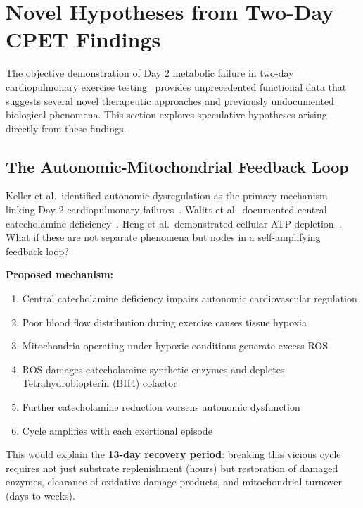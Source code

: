 \section{Novel Hypotheses from Two-Day CPET Findings}
\label{sec:cpet-hypotheses}

The objective demonstration of Day 2 metabolic failure in two-day cardiopulmonary exercise testing~\cite{keller2024cpet} provides unprecedented functional data that suggests several novel therapeutic approaches and previously undocumented biological phenomena. This section explores speculative hypotheses arising directly from these findings.

\subsection{The Autonomic-Mitochondrial Feedback Loop}
\label{subsec:autonomic-mito-loop}

\begin{open_question}
Keller et al.\ identified autonomic dysregulation as the primary mechanism linking Day 2 cardiopulmonary failures~\cite{keller2024cpet}. Walitt et al.\ documented central catecholamine deficiency~\cite{walitt2024deep}. Heng et al.\ demonstrated cellular ATP depletion~\cite{heng2025mecfs}. What if these are not separate phenomena but nodes in a self-amplifying feedback loop?

\textbf{Proposed mechanism:}
\begin{enumerate}
    \item Central catecholamine deficiency impairs autonomic cardiovascular regulation
    \item Poor blood flow distribution during exercise causes tissue hypoxia
    \item Mitochondria operating under hypoxic conditions generate excess ROS
    \item ROS damages catecholamine synthetic enzymes and depletes Tetrahydrobiopterin (BH4) cofactor
    \item Further catecholamine reduction worsens autonomic dysfunction
    \item Cycle amplifies with each exertional episode
\end{enumerate}

This would explain the \textbf{13-day recovery period}: breaking this vicious cycle requires not just substrate replenishment (hours) but restoration of damaged enzymes, clearance of oxidative damage products, and mitochondrial turnover (days to weeks).
\end{open_question}

